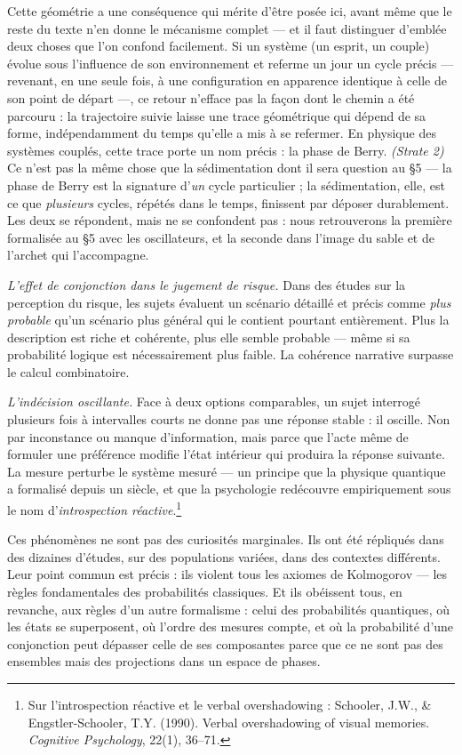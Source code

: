 \documentclass[french, 11pt, twoside, openright, a5paper]{book}
\begin{document}
Cette géométrie a une conséquence qui mérite d'être posée ici, avant
même que le reste du texte n'en donne le mécanisme complet --- et il
faut distinguer d'emblée deux choses que l'on confond facilement. Si un
système (un esprit, un couple) évolue sous l'influence de son
environnement et referme un jour un cycle précis --- revenant, en une
seule fois, à une configuration en apparence identique à celle de son
point de départ ---, ce retour n'efface pas la façon dont le chemin a
été parcouru : la trajectoire suivie laisse une trace géométrique qui
dépend de sa forme, indépendamment du temps qu'elle a mis à se refermer.
En physique des systèmes couplés, cette trace porte un nom précis : la
phase de Berry. \emph{(Strate 2)} Ce n'est pas la même chose que la
sédimentation dont il sera question au §5 --- la phase de Berry est la
signature d'\emph{un} cycle particulier ; la sédimentation, elle, est ce
que \emph{plusieurs} cycles, répétés dans le temps, finissent par
déposer durablement. Les deux se répondent, mais ne se confondent pas :
nous retrouverons la première formalisée au §5 avec les oscillateurs, et
la seconde dans l'image du sable et de l'archet qui l'accompagne.

\emph{L'effet de conjonction dans le jugement de risque.} Dans des
études sur la perception du risque, les sujets évaluent un scénario
détaillé et précis comme \emph{plus probable} qu'un scénario plus
général qui le contient pourtant entièrement. Plus la description est
riche et cohérente, plus elle semble probable --- même si sa probabilité
logique est nécessairement plus faible. La cohérence narrative surpasse
le calcul combinatoire.

\emph{L'indécision oscillante.} Face à deux options comparables, un
sujet interrogé plusieurs fois à intervalles courts ne donne pas une
réponse stable : il oscille. Non par inconstance ou manque
d'information, mais parce que l'acte même de formuler une préférence
modifie l'état intérieur qui produira la réponse suivante. La mesure
perturbe le système mesuré --- un principe que la physique quantique a
formalisé depuis un siècle, et que la psychologie redécouvre
empiriquement sous le nom d'\emph{introspection réactive}.\footnote{Sur l'introspection réactive et le verbal overshadowing : Schooler, J.W., \& Engstler-Schooler, T.Y. (1990). Verbal overshadowing of visual memories. \emph{Cognitive Psychology}, 22(1), 36--71.}

Ces phénomènes ne sont pas des curiosités marginales. Ils ont été
répliqués dans des dizaines d'études, sur des populations variées, dans
des contextes différents. Leur point commun est précis : ils violent
tous les axiomes de Kolmogorov --- les règles fondamentales des
probabilités classiques. Et ils obéissent tous, en revanche, aux règles
d'un autre formalisme : celui des probabilités quantiques, où les états
se superposent, où l'ordre des mesures compte, et où la probabilité
d'une conjonction peut dépasser celle de ses composantes parce que ce ne
sont pas des ensembles mais des projections dans un espace de phases.
\end{document}
